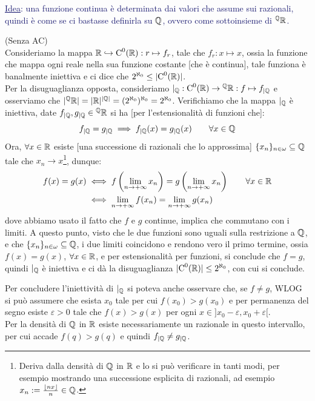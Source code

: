 \textcolor{MidnightBlue}{\underline{Idea}: una funzione continua \`e determinata dai valori che assume sui razionali, quindi \`e come se ci bastasse definirla su $\mathbb Q$, ovvero come sottoinsieme di ${}^\mathbb Q \mathbb R$.}

\begin{soln}
	(Senza AC)\\
	Consideriamo la mappa $\mathbb R \hookrightarrow \text C^0(\mathbb R) : r \mapsto f_r$, tale che $f_r : x \mapsto x$, ossia la funzione che mappa ogni reale nella sua funzione costante [che \`e continua], tale funziona \`e banalmente iniettiva
	e ci dice che $2^{\aleph_0} \leq |\text C^0(\mathbb R)|$.\\
	Per la disuguaglianza opposta, consideriamo $|_\mathbb Q : \text C^0(\mathbb R) \rightarrow {}^\mathbb Q \mathbb R : f \mapsto f_{|\mathbb Q}$ e osserviamo che $|{}^\mathbb Q \mathbb R| = |\mathbb R|^{|\mathbb Q|} = (2^{\aleph_0})^{\aleph_0} = 2^{\aleph_0}$. Verifichiamo che la mappa $|_{\mathbb Q}$ \`e iniettiva,
	date $f_{|\mathbb Q},g_{|\mathbb Q} \in {}^{\mathbb Q}\mathbb R$ si ha [per l'estensionalit\`a di funzioni che]:
	\[ f_{|\mathbb Q} = g_{|\mathbb Q} \implies f_{|\mathbb Q}(x) = g_{|\mathbb Q}(x) \qquad \forall x \in \mathbb Q 
		\]
	Ora, $\forall x \in \mathbb R$ esiste [una successione di razionali che lo approssima] $\{x_n\}_{n\in \omega} \subseteq \mathbb Q$ tale che $x_n \to x$\footnote{Deriva dalla densit\`a di $\mathbb Q$ in $\mathbb R$ e lo si pu\`o verificare in tanti modi,
	per esempio mostrando una successione esplicita di razionali, ad esempio $x_n := \frac{\left\lfloor nx\right\rfloor}{n} \in \QQ$.}, dunque:
	\[ \begin{split}
		f(x) = g(x) &\iff f\left(\lim_{n \to +\infty} x_n\right) = g\left(\lim_{n \to +\infty} x_n\right) \qquad \forall x \in \RR \\
					&\iff \lim_{n \to +\infty} f(x_n) = \lim_{n \to +\infty} g(x_n)
	\end{split}
		\]
	dove abbiamo usato il fatto che $f$ e $g$ continue, implica che commutano con i limiti. A questo punto, visto che le due funzioni sono uguali sulla restrizione a $\mathbb Q$, e che $\{x_n\}_{n \in \omega} \subseteq \mathbb Q$,
	i due limiti coincidono e rendono vero il primo termine, ossia $f(x) = g(x)$, $\forall x \in \mathbb R$,
	e per estensionalit\`a per funzioni, si conclude che $f = g$, quindi $|_{\mathbb Q}$ \`e iniettiva e ci d\`a la disuguaglianza $|\text C^0(\mathbb R)| \leq 2^{\aleph_0}$, con cui si conclude.
\end{soln}

\begin{remark}
	Per concludere l'iniettivit\`a di $|_\mathbb Q$ si poteva anche osservare che, se $f \ne g$, WLOG si pu\`o assumere che esista $x_0$ tale per cui $f(x_0) > g(x_0)$ e per permanenza del segno esiste $\varepsilon > 0$ tale che $f(x) > g(x)$ per ogni $x \in ]x_0 - \varepsilon, x_0 + \varepsilon[$.\\
	Per la densit\`a di $\mathbb Q$ in $\mathbb R$ esiste necessariamente un razionale in questo intervallo, per cui accade $f(q) > g(q)$ e quindi $f_{|\mathbb Q} \ne g_{|\mathbb Q}$. 
\end{remark}

